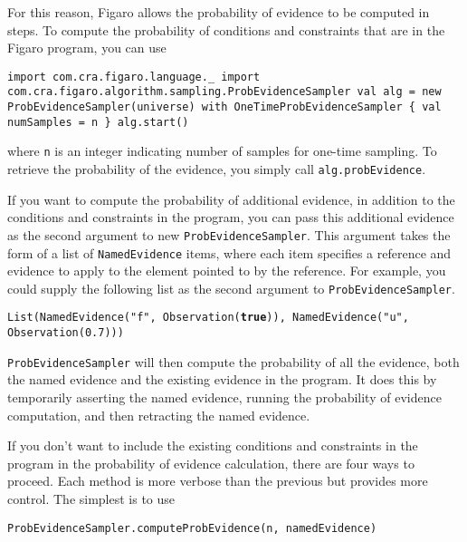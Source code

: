 For this reason, Figaro allows the probability of evidence to be computed in steps. To compute the probability of conditions and constraints that are in the Figaro program, you can use

\begin{flushleft}
\texttt{import com.cra.figaro.language.\_
\newline \tab import com.cra.figaro.algorithm.sampling.ProbEvidenceSampler
\newline 
\newline val alg = new ProbEvidenceSampler(universe) with
\newline \tab OneTimeProbEvidenceSampler \{ val numSamples = n \}
\newline alg.start()
}
\end{flushleft}

where \texttt{n} is an integer indicating number of samples for one-time sampling. To retrieve the probability of the evidence, you simply call \texttt{alg.probEvidence}.

If you want to compute the probability of additional evidence, in addition to the conditions and constraints in the program, you can pass this additional evidence as the second argument to new \texttt{ProbEvid\-enceSampler}. This argument takes the form of a list of \texttt{NamedEvidence} items, where each item specifies a reference and evidence to apply to the element pointed to by the reference. For example, you could supply the following list as the second argument to \texttt{ProbEvidenceSampler}.

\begin{flushleft}
\texttt{List(NamedEvidence("f", Observation(\textbf{true})), 
\newline NamedEvidence("u", Observation(0.7))) }
\end{flushleft}

\texttt{ProbEvidenceSampler} will then compute the probability of all the evidence, both the named evidence and the existing evidence in the program. It does this by temporarily asserting the named evidence, running the probability of evidence computation, and then retracting the named evidence.

If you don't want to include the existing conditions and constraints in the program in the probability of evidence calculation, there are four ways to proceed. Each method is more verbose than the previous but provides more control. The simplest is to use

\begin{flushleft}
\texttt{ProbEvidenceSampler.computeProbEvidence(n, namedEvidence)}
\end{flushleft}

